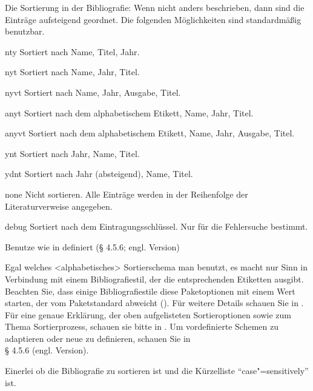 \documentclass{ltxdockit}[2011/03/25]
\begin{document}
\begin{optionlist}


Die Sortierung in der Bibliografie: Wenn nicht anders beschrieben, dann sind die
Einträge aufsteigend geordnet. Die folgenden Möglichkeiten sind standardmäßig
benutzbar.

\begin{valuelist} 
\item[nty] Sortiert nach Name, Titel, Jahr.  
\item[nyt]
Sortiert nach Name, Jahr, Titel.  
\item[nyvt] Sortiert nach Name, Jahr, Ausgabe,
Titel.  
\item[anyt] Sortiert nach dem alphabetischem Etikett, Name, Jahr, Titel.
\item[anyvt] Sortiert nach dem alphabetischem Etikett, Name, Jahr, Ausgabe,
Titel.  
\item[ynt] Sortiert nach Jahr, Name, Titel.  
\item[ydnt] Sortiert nach
Jahr (absteigend), Name, Titel.  
\item[none] Nicht sortieren. Alle Einträge
werden in der Reihenfolge der Literaturverweise angegeben. 
\item[debug]
Sortiert nach dem Eintragungsschlüssel. Nur für die Fehlersuche bestimmt.
\item[\prm{name}]  Benutze  wie in
 definiert (§ 4.5.6; engl. Version) %
\end{valuelist}

Egal welches <alphabetisches> Sortierschema man benutzt, es macht nur Sinn in
Verbindung mit einem Bibliografiestil, der die entsprechenden Etiketten
ausgibt. Beachten Sie, dass einige Bibliografiestile diese Paketoptionen mit
einem Wert starten, der vom Paketstandard abweicht (). Für weitere
Details schauen Sie in . Für eine genaue Erklärung, der oben
aufgelisteten Sortieroptionen sowie zum Thema Sortierprozess, schauen sie
bitte in . Um vordefinierte Schemen zu adaptieren oder neue zu
definieren, schauen Sie in \\ § 4.5.6 (engl. Version). %


Einerlei ob die Bibliografie zu sortieren ist und die Kürzelliste "`case"=sensitively"' ist.


\end{optionlist}
\end{document}
